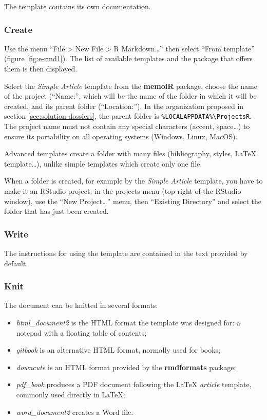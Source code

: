 \documentclass[
  12pt,
  american,
  a4paper,
  extrafontsizes,onecolumn,openright
  ]{memoir}
\providecommand{\tightlist}{%
  \setlength{\itemsep}{0pt}\setlength{\parskip}{0pt}}
\begin{document}
The template contains its own documentation.

\hypertarget{create}{%
\subsubsection{Create}\label{create}}

Use the menu \enquote{File \textgreater{} New File \textgreater{} R Markdown\ldots{}} then select \enquote{From template} (figure \ref{fig:e-rmd1}).
The list of available templates and the package that offers them is then displayed.

Select the \emph{Simple Article} template from the \textbf{memoiR} package, choose the name of the project (\enquote{Name:}, which will be the name of the folder in which it will be created, and its parent folder (\enquote{Location:}).
In the organization proposed in section \ref{sec:solution-dossiers}, the parent folder is \texttt{\%LOCALAPPDATA\%\textbackslash{}ProjectsR}.
The project name must not contain any special characters (accent, space\ldots) to ensure its portability on all operating systems (Windows, Linux, MacOS).

Advanced templates create a folder with many files (bibliography, styles, LaTeX template\ldots), unlike simple templates which create only one file.

When a folder is created, for example by the \emph{Simple Article} template, you have to make it an RStudio project: in the projects menu (top right of the RStudio window), use the \enquote{New Project\ldots{}} menu, then \enquote{Existing Directory} and select the folder that has just been created.

\hypertarget{write}{%
\subsubsection{Write}\label{write}}

The instructions for using the template are contained in the text provided by default.

\hypertarget{knit}{%
\subsubsection{Knit}\label{knit}}

The document can be knitted in several formats:

\begin{itemize}
\tightlist
\item
  \emph{html\_document2} is the HTML format the template was designed for: a notepad with a floating table of contents;
\item
  \emph{gitbook} is an alternative HTML format, normally used for books;
\item
  \emph{downcute} is an HTML format provided by the \textbf{rmdformats} package;
\item
  \emph{pdf\_book} produces a PDF document following the LaTeX \emph{article} template, commonly used directly in LaTeX;
\item
  \emph{word\_document2} creates a Word file.
\end{itemize}
\end{document}
